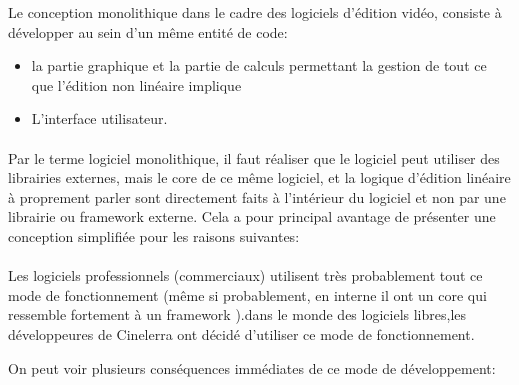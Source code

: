 Le conception monolithique  dans le cadre des
logiciels d'édition vidéo, consiste à développer au sein d'un même
entité de code:

\begin{itemize} \setlength{\itemsep}{2mm}

  \item {la partie graphique et la partie de calculs
    permettant la gestion de tout ce que l'édition non linéaire
    implique}

  \item {L'interface utilisateur.}

\end {itemize}

\paragraph{}

Par le terme logiciel monolithique, il faut réaliser
que le logiciel peut utiliser des librairies externes, mais le core de
ce même logiciel, et la logique d'édition linéaire à proprement
parler sont directement faits à l'intérieur du logiciel et non par
une librairie ou framework  externe. Cela a pour
principal avantage de présenter une conception simplifiée pour les
raisons suivantes:

\paragraph{}

Les logiciels professionnels (commerciaux) utilisent très probablement
tout ce mode de fonctionnement (même si probablement, en interne il ont
un core qui ressemble fortement à un framework ).dans
le monde des logiciels libres,les développeures de Cinelerra ont décidé
d'utiliser ce mode de fonctionnement.

On peut voir plusieurs conséquences immédiates de ce mode de
développement:


